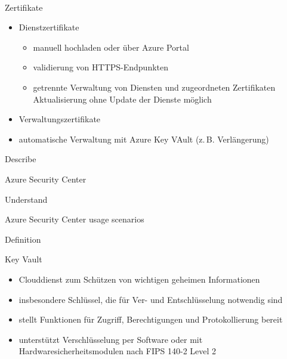 \documentclass{scrartcl}
\newenvironment{flashcard}[2][]{%
    #1
    \vfill
    \centerline{\Large{#2}}
    \vfill
\newpage
}
{\newpage}
\begin{document}
    \begin{flashcard}[\ ]{Zertifikate}
        \begin{itemize}
            \item Dienstzertifikate
            \begin{itemize}
                \item manuell hochladen oder über Azure Portal
                \item validierung von HTTPS-Endpunkten
                \item getrennte Verwaltung von Diensten und zugeordneten Zertifikaten\newline
                Aktualisierung ohne Update der Dienste möglich
            \end{itemize}
            \item Verwaltungszertifikate
            \item automatische Verwaltung mit Azure Key VAult (z.\,B. Verlängerung)
        \end{itemize}

    \end{flashcard}

    \begin{flashcard}[Describe]{Azure Security Center}

    \end{flashcard}

    \begin{flashcard}[Understand]{Azure Security Center usage scenarios}

    \end{flashcard}

    \begin{flashcard}[Definition]{Key Vault}
        \begin{itemize}
            \item Clouddienst zum Schützen von wichtigen geheimen Informationen
            \item insbesondere Schlüssel, die für Ver- und Entschlüsselung notwendig sind
            \item stellt Funktionen für Zugriff, Berechtigungen und Protokollierung bereit
            \item unterstützt Verschlüsselung per Software oder mit Hardwaresicherheitsmodulen nach FIPS 140-2 Level 2
        \end{itemize}
    \end{flashcard}
\end{document}

